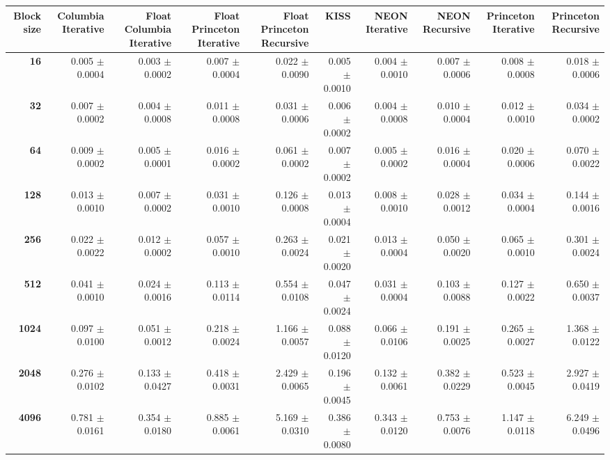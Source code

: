 \begin{tabular}{rrrrrrrrrr}\toprule
\textbf{Block size}  & \textbf{Columbia Iterative} & \textbf{Float Columbia Iterative} & \textbf{Float Princeton Iterative} & \textbf{Float Princeton Recursive} & \textbf{KISS} & \textbf{NEON Iterative} & \textbf{NEON Recursive} & \textbf{Princeton Iterative} & \textbf{Princeton Recursive}\\\midrule
\textbf{16}  & 0.005 $\pm$ 0.0004 & 0.003 $\pm$ 0.0002 & 0.007 $\pm$ 0.0004 & 0.022 $\pm$ 0.0090 & 0.005 $\pm$ 0.0010 & 0.004 $\pm$ 0.0010 & 0.007 $\pm$ 0.0006 & 0.008 $\pm$ 0.0008 & 0.018 $\pm$ 0.0006\\
\textbf{32}  & 0.007 $\pm$ 0.0002 & 0.004 $\pm$ 0.0008 & 0.011 $\pm$ 0.0008 & 0.031 $\pm$ 0.0006 & 0.006 $\pm$ 0.0002 & 0.004 $\pm$ 0.0008 & 0.010 $\pm$ 0.0004 & 0.012 $\pm$ 0.0010 & 0.034 $\pm$ 0.0002\\
\textbf{64}  & 0.009 $\pm$ 0.0002 & 0.005 $\pm$ 0.0001 & 0.016 $\pm$ 0.0002 & 0.061 $\pm$ 0.0002 & 0.007 $\pm$ 0.0002 & 0.005 $\pm$ 0.0002 & 0.016 $\pm$ 0.0004 & 0.020 $\pm$ 0.0006 & 0.070 $\pm$ 0.0022\\
\textbf{128}  & 0.013 $\pm$ 0.0010 & 0.007 $\pm$ 0.0002 & 0.031 $\pm$ 0.0010 & 0.126 $\pm$ 0.0008 & 0.013 $\pm$ 0.0004 & 0.008 $\pm$ 0.0010 & 0.028 $\pm$ 0.0012 & 0.034 $\pm$ 0.0004 & 0.144 $\pm$ 0.0016\\
\textbf{256}  & 0.022 $\pm$ 0.0022 & 0.012 $\pm$ 0.0002 & 0.057 $\pm$ 0.0010 & 0.263 $\pm$ 0.0024 & 0.021 $\pm$ 0.0020 & 0.013 $\pm$ 0.0004 & 0.050 $\pm$ 0.0020 & 0.065 $\pm$ 0.0010 & 0.301 $\pm$ 0.0024\\
\textbf{512}  & 0.041 $\pm$ 0.0010 & 0.024 $\pm$ 0.0016 & 0.113 $\pm$ 0.0114 & 0.554 $\pm$ 0.0108 & 0.047 $\pm$ 0.0024 & 0.031 $\pm$ 0.0004 & 0.103 $\pm$ 0.0088 & 0.127 $\pm$ 0.0022 & 0.650 $\pm$ 0.0037\\
\textbf{1024}  & 0.097 $\pm$ 0.0100 & 0.051 $\pm$ 0.0012 & 0.218 $\pm$ 0.0024 & 1.166 $\pm$ 0.0057 & 0.088 $\pm$ 0.0120 & 0.066 $\pm$ 0.0106 & 0.191 $\pm$ 0.0025 & 0.265 $\pm$ 0.0027 & 1.368 $\pm$ 0.0122\\
\textbf{2048}  & 0.276 $\pm$ 0.0102 & 0.133 $\pm$ 0.0427 & 0.418 $\pm$ 0.0031 & 2.429 $\pm$ 0.0065 & 0.196 $\pm$ 0.0045 & 0.132 $\pm$ 0.0061 & 0.382 $\pm$ 0.0229 & 0.523 $\pm$ 0.0045 & 2.927 $\pm$ 0.0419\\
\textbf{4096}  & 0.781 $\pm$ 0.0161 & 0.354 $\pm$ 0.0180 & 0.885 $\pm$ 0.0061 & 5.169 $\pm$ 0.0310 & 0.386 $\pm$ 0.0080 & 0.343 $\pm$ 0.0120 & 0.753 $\pm$ 0.0076 & 1.147 $\pm$ 0.0118 & 6.249 $\pm$ 0.0496\\

\end{tabular}
